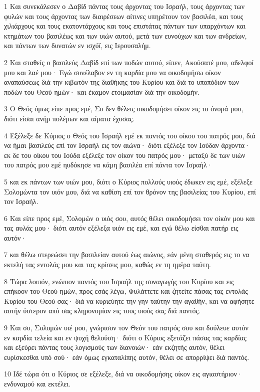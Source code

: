 \par 1 Και συνεκάλεσεν ο Δαβίδ πάντας τους άρχοντας του Ισραήλ, τους άρχοντας των φυλών και τους άρχοντας των διαιρέσεων αίτινες υπηρέτουν τον βασιλέα, και τους χιλιάρχους και τους εκατοντάρχους και τους επιστάτας πάντων των υπαρχόντων και κτημάτων του βασιλέως και των υιών αυτού, μετά των ευνούχων και των ανδρείων, και πάντων των δυνατών εν ισχύϊ, εις Ιερουσαλήμ.
\par 2 Και σταθείς ο βασιλεύς Δαβίδ επί των ποδών αυτού, είπεν, Ακούσατέ μου, αδελφοί μου και λαέ μου· Εγώ συνέλαβον εν τη καρδία μου να οικοδομήσω οίκον αναπαύσεως διά την κιβωτόν της διαθήκης του Κυρίου και διά το υποπόδιον των ποδών του Θεού ημών· και έκαμον ετοιμασίαν διά την οικοδομήν.
\par 3 Ο Θεός όμως είπε προς εμέ, Συ δεν θέλεις οικοδομήσει οίκον εις το όνομά μου, διότι είσαι ανήρ πολέμων και αίματα έχυσας.
\par 4 Εξέλεξε δε Κύριος ο Θεός του Ισραήλ εμέ εκ παντός του οίκου του πατρός μου, διά να ήμαι βασιλεύς επί τον Ισραήλ εις τον αιώνα· διότι εξέλεξε τον Ιούδαν άρχοντα· εκ δε του οίκου του Ιούδα εξέλεξε τον οίκον του πατρός μου· μεταξύ δε των υιών του πατρός μου εμέ ηυδόκησε να κάμη βασιλέα επί πάντα τον Ισραήλ·
\par 5 και εκ πάντων των υιών μου, διότι ο Κύριος πολλούς υιούς έδωκεν εις εμέ, εξέλεξε Σολομώντα τον υιόν μου, διά να καθίση επί τον θρόνον της βασιλείας του Κυρίου, επί τον Ισραήλ.
\par 6 Και είπε προς εμέ, Σολομών ο υιός σου, αυτός θέλει οικοδομήσει τον οίκόν μου και τας αυλάς μου· διότι αυτόν εξέλεξα υιόν εις εμέ, και εγώ θέλω είσθαι πατήρ εις αυτόν·
\par 7 και θέλω στερεώσει την βασιλείαν αυτού έως αιώνος, εάν μένη σταθερός εις το να εκτελή τας εντολάς μου και τας κρίσεις μου, καθώς εν τη ημέρα ταύτη.
\par 8 Τώρα λοιπόν, ενώπιον παντός του Ισραήλ της συναγωγής του Κυρίου και εις επήκοον του Θεού ημών, προς εσάς λέγω, Φυλάττετε και ζητείτε πάσας τας εντολάς Κυρίου του Θεού σας· διά να κυριεύητε την γην ταύτην την αγαθήν, και να αφήσητε αυτήν ύστερον από σας κληρονομίαν εις τους υιούς σας διά παντός.
\par 9 Και συ, Σολομών υιέ μου, γνώρισον τον Θεόν του πατρός σου και δούλευε αυτόν εν καρδία τελεία και εν ψυχή θελούση· διότι ο Κύριος εξετάζει πάσας τας καρδίας και εξεύρει πάντας τους λογισμούς των διανοιών· εάν εκζητής αυτόν, θέλει ευρίσκεσθαι υπό σού· εάν όμως εγκαταλίπης αυτόν, θέλει σε απορρίψει διά παντός.
\par 10 Ιδέ τώρα ότι ο Κύριος σε εξέλεξε, διά να οικοδομήσης οίκον εις αγιαστήριον· ενδυναμού και εκτέλει.
